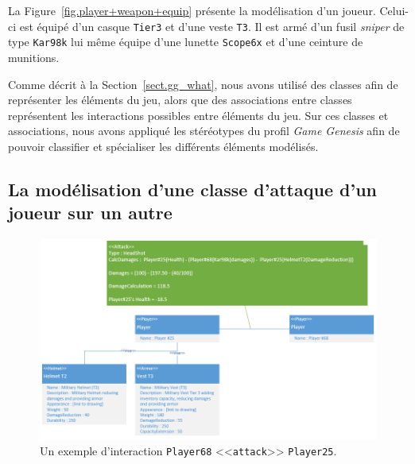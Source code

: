 La Figure~\ref{fig.player+weapon+equip} présente la modélisation d'un joueur.
Celui-ci est équipé d'un casque \texttt{Tier3} et d'une veste \texttt{T3}. 
Il est armé d'un fusil \emph{sniper} de type \texttt{Kar98k} lui même équipe d'une lunette \texttt{Scope6x} et d'une ceinture de munitions.



Comme décrit \`a la Section~\ref{sect.gg_what}, nous avons utilisé des classes afin de représenter les éléments du jeu, alors que des associations entre classes représentent les interactions possibles entre éléments du jeu.
Sur ces classes et associations, nous avons appliqué les stéréotypes du profil \emph{Game Genesis} afin de pouvoir classifier et spécialiser les différents éléments modélisés.



\subsection{La modélisation d'une classe d'attaque d'un joueur sur un autre}
\begin{figure}
    \centering
    \includegraphics[width=14cm]{10_img/chap6/attack.PNG} 
    \caption{Un exemple d'interaction \texttt{Player68} <<\texttt{attack}>> \texttt{Player25}.}
    \label{fig.attack}
\end{figure}

